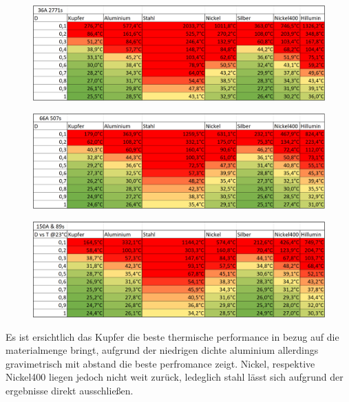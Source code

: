  \begin{figure}[h]
 	\centering
 	\includegraphics[width=0.7\linewidth]{bilder/Busbar_temp_36A_2771s}
 	\caption{}
 	\label{fig:Busbar_temp_36A_2771s}
 \end{figure}
\begin{figure}[h]
	\centering
	\includegraphics[width=0.7\linewidth]{bilder/Busbar_temp_66A_507s}
	\caption{}
	\label{fig:Busbar_temp_66A_507s}
\end{figure}
\begin{figure}[h]
	\centering
	\includegraphics[width=0.7\linewidth]{bilder/Busbar_temp_150A_89s}
	\caption{}
	\label{fig:Busbar_temp_150A_89s}
\end{figure}

Es ist ersichtlich das Kupfer die beste thermische performance in bezug auf die materialmenge bringt, aufgrund der niedrigen dichte aluminium allerdings gravimetrisch mit abstand die beste perfromance zeigt. Nickel, respektive Nickel400 liegen jedoch nicht weit zurück, ledeglich stahl lässt sich aufgrund der ergebnisse direkt ausschließen.

